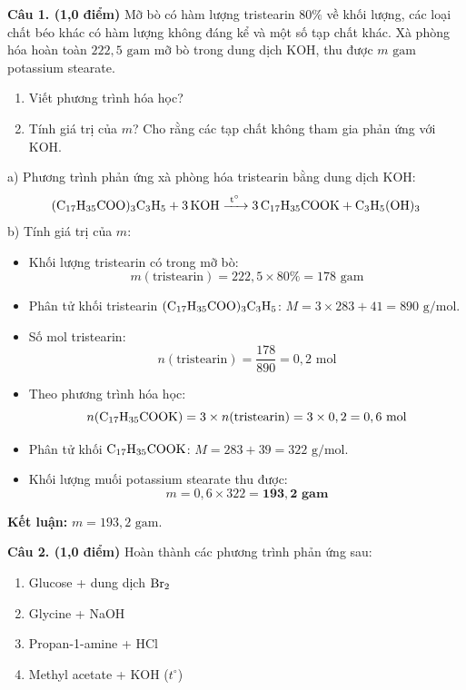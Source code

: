 \documentclass[11pt,a4paper]{article}
\begin{document}
\noindent
\textbf{Câu 1. (1,0 điểm)} Mỡ bò có hàm lượng tristearin $80\%$ về khối lượng, các loại chất béo khác có hàm lượng không đáng kể và một số tạp chất khác. Xà phòng hóa hoàn toàn $222,5\text{ gam}$ mỡ bò trong dung dịch KOH, thu được $m\text{ gam}$ potassium stearate.
\begin{enumerate}[label=\alph*),leftmargin=20pt,itemsep=1pt]
\item Viết phương trình hóa học?
\item Tính giá trị của $m$? Cho rằng các tạp chất không tham gia phản ứng với KOH.
\end{enumerate}

\begin{tcolorbox}[colback=tableGreen!30,colframe=mainGreen!70,title=\textbf{Hướng dẫn giải chi tiết Câu 1},fonttitle=\bfseries]
a) Phương trình phản ứng xà phòng hóa tristearin bằng dung dịch KOH:
\[
\ce{(C17H35COO)3C3H5 + 3KOH ->[t^\circ] 3C17H35COOK + C3H5(OH)3}
\]
b) Tính giá trị của $m$:
\begin{itemize}[leftmargin=15pt,itemsep=1pt]
\item Khối lượng tristearin có trong mỡ bò:
\[
m(\text{tristearin}) = 222,5 \times 80\% = 178\text{ gam}
\]
\item Phân tử khối tristearin $\ce{(C17H35COO)3C3H5}$: $M = 3 \times 283 + 41 = 890\text{ g/mol}$.
\item Số mol tristearin:
\[
n(\text{tristearin}) = \frac{178}{890} = 0,2\text{ mol}
\]
\item Theo phương trình hóa học:
\[
n(\ce{C17H35COOK}) = 3 \times n(\text{tristearin}) = 3 \times 0,2 = 0,6\text{ mol}
\]
\item Phân tử khối $\ce{C17H35COOK}$: $M = 283 + 39 = 322\text{ g/mol}$.
\item Khối lượng muối potassium stearate thu được:
\[
m = 0,6 \times 322 = \mathbf{193,2\text{ gam}}
\]
\end{itemize}
\textbf{Kết luận:} $m = 193,2\text{ gam}$.
\end{tcolorbox}

\vspace{2pt}
\noindent
\textbf{Câu 2. (1,0 điểm)} Hoàn thành các phương trình phản ứng sau:
\begin{enumerate}[label=\alph*),leftmargin=20pt,itemsep=1pt]
\item Glucose + dung dịch $\ce{Br2}$
\item Glycine + NaOH
\item Propan-1-amine + HCl
\item Methyl acetate + KOH ($t^\circ$)
\end{enumerate}
\end{document}
